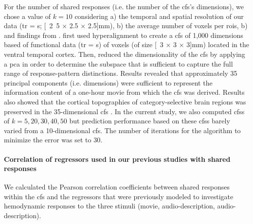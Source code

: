 For the number of shared responses (i.e. the number of the \ac{cfs}'s
dimensions), we chose a value of $k=10$ considering a) the temporal and spatial
resolution of our data (\ac{tr} = \unit[2]{s}; \unit[2.5 $\times$ 2.5 $\times$
2.5]{mm}), b) the average number of voxels per \acp{roi}, b) and findings from
\citet{haxby2011common}.
%
\citet{haxby2011common} first used hyperalignment to create a \ac{cfs} of 1,000
dimensions based of functional data (\ac{tr} = \unit[3]{s}) of voxels (of size
\unit[3 $\times$ 3 $\times$ 3]{mm}) located in the ventral temporal cortex.
%
Then, \citet{haxby2011common} reduced the dimensionality of the \ac{cfs} by
applying a \ac{pca} in order to determine the subspace that is sufficient to
capture the full range of response-pattern distinctions.
%
Results revealed that approximately 35 principal components (i.e. dimensions)
were sufficient to represent the information content of a one-hour movie from
which the \ac{cfs} was derived.
%
Results also showed that the cortical topographies of category-selective brain
regions was preserved in the 35-dimensional \ac{cfs} \citep{haxby2011common}.
%
In the current study, we also computed \acp{cfs} of $k=5, 20, 30, 40, 50$ but
prediction performance based on these \acp{cfs} barely varied from a
10-dimensional \ac{cfs}.
The number of iterations for the algorithm to minimize the error was set to 30.



\paragraph{Correlation of regressors used in our previous studies with shared
responses}






We calculated the Pearson correlation coefficients between shared responses
within the \ac{cfs} and the regressors that were previously modeled
\citep{sengupta2016extension, haeusler2022processing} to investigate hemodynamic
responses to the three stimuli (movie, audio-description, audio-description).

